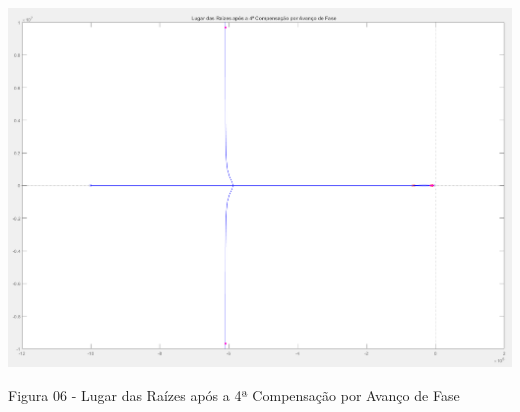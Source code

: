 \documentclass[a4paper]{article}
\begin{document}
 \begin{center}
	\includegraphics[width=40em,keepaspectratio]{lugar_das_raizes_14_compensacao_requerimentos}
	\par Figura 06 - Lugar das Raízes após a 4ª Compensação por Avanço de Fase
 \end{center}
\end{document}

